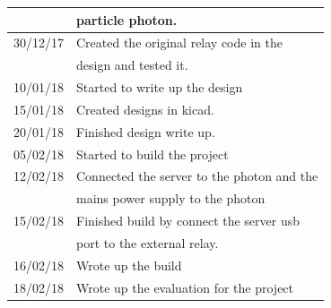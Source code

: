 \documentclass{article}
\begin{document}
\begin{tabularx}{\textwidth}{| X | X |}
                             &particle photon.                           \\ \hline
    30/12/17                 &Created the original relay code in the     \\
                             &design and tested it.                      \\ \hline
    10/01/18                 &Started to write up the design             \\ \hline
    15/01/18                 &Created designs in kicad.                  \\ \hline
    20/01/18                 &Finished design write up.                  \\ \hline
    05/02/18                 &Started to build the project               \\ \hline
    12/02/18                 &Connected the server to the photon and the \\
                             &mains power supply to the photon           \\ \hline
    15/02/18                 &Finished build by connect the server usb   \\
                             &port to the external relay.                \\ \hline
    16/02/18                 &Wrote up the build                         \\ \hline
    18/02/18                 &Wrote up the evaluation for the project    \\ \hline
\end{tabularx}
\end{document}
